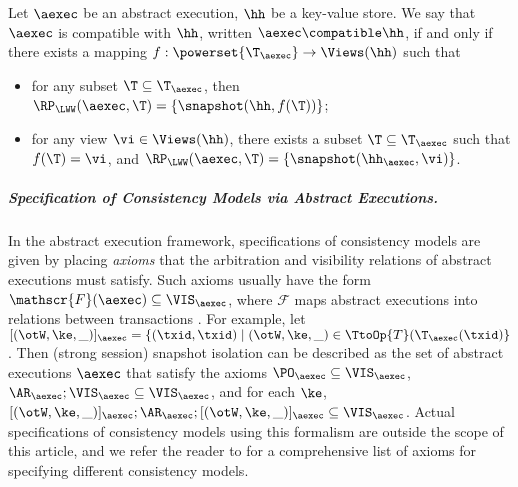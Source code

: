 \begin{definition}
Let $\aexec$ be an abstract execution, $\hh$ be a key-value store. 
We say that $\aexec$ is compatible with $\hh$, written 
$\aexec \compatible \hh$, if and only if there exists a  mapping 
$f: \powerset{\T_{\aexec}} \rightarrow \Views(\hh)$
such that  
\begin{itemize}
\item for any subset $\T \subseteq \T_{\aexec}$, then $\RP_{\LWW}(\aexec, \T) = \{\snapshot(\hh, f(\T))\}$; 
\item for any view $\vi \in \Views(\hh)$, there exists a subset $\T \subseteq \T_{\aexec}$ 
such that $f(\T) = \vi$, and $\RP_{\LWW}(\aexec, \T) = \{\snapshot(\hh_{\aexec}, \vi)\}$.
\end{itemize}
\end{definition}


\subparagraph{Specification of Consistency Models via Abstract Executions.}
In the abstract execution framework, specifications of consistency models are given by placing \emph{axioms} that the 
arbitration and visibility relations of abstract executions must satisfy. Such axioms usually 
have the form $\mathscr{F}(\aexec) \subseteq \VIS_{\aexec}$, 
where $\mathscr{F}$ maps abstract executions into relations between transactions \cite{laws}. 
For example, let $[(\otW, \ke, \_)]_{\aexec} = \{(\txid, \txid) \mid (\otW, \ke, \_) \in \TtoOp{T}(\T_{\aexec}(\txid) \}$. 
Then (strong session) snapshot isolation can be described as the set of abstract executions $\aexec$ that 
satisfy the axioms $\PO_{\aexec} \subseteq \VIS_{\aexec}$, $\AR_{\aexec} ; \VIS_{\aexec} \subseteq \VIS_{\aexec}$, 
and for each $\ke$, $[(\otW, \ke, \_)]_{\aexec} ; \AR_{\aexec} ; [(\otW, \ke, \_)]_{\aexec} \subseteq \VIS_{\aexec}$. 
Actual specifications of consistency models using this formalism are outside the scope of this article, and we 
refer the reader to \cite{laws} for a comprehensive list of axioms for specifying different consistency models.

